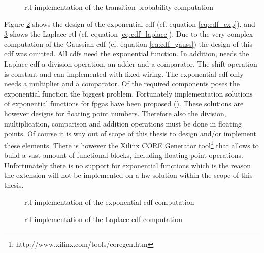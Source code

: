 \documentclass[mscthesis]{usiinfthesis}
\begin{document}
\begin{figure}
    \centering
    
    \caption{\acrshort{rtl} implementation of the transition probability
        computation}
    \label{fig:arch_ext}
\end{figure}

Figure \ref{fig:arch_cdf1} shows the design of the exponential \gls{cdf} (cf.
equation \ref{eq:cdf_exp}), and \ref{fig:arch_cdf2} shows the Laplace \gls{rtl}
(cf. equation \ref{eq:cdf_laplace}). Due to the very complex computation of the
Gaussian \gls{cdf} (cf. equation \ref{eq:cdf_gauss}) the design of this
\gls{cdf} was omitted. All \glspl{cdf} need the exponential function. In
addition, needs the Laplace \gls{cdf} a division operation, an adder and
a comparator. The shift operation is constant and can implemented with fixed
wiring. The exponential \gls{cdf} only needs a multiplier and a comparator. Of
the required components poses the exponential function the biggest problem.
Fortunately implementation solutions of exponential functions for \glspl{fpga}
have been proposed (\cite{RSSI08_Pottathuparambil, ICFPT05_Detrey}). These
solutions are however designs for floating point numbers. Therefore also the
division, multiplication, comparison and addition operations must be done in
floating points. Of course it is way out of scope of this thesis to design
and/or implement these elements.  There is however the Xilinx CORE Generator
tool\footnote{http://www.xilinx.com/tools/coregen.htm} that allows to build
a vast amount of functional blocks, including floating point operations.
Unfortunately there is no support for exponential functions which is the reason
the extension will not be implemented on a \gls{hw} solution within the scope
of this thesis.

\begin{figure}
    \centering
    
    \caption{\acrshort{rtl} implementation of the exponential \acrshort{cdf}
        computation}
    \label{fig:arch_cdf1}
\end{figure}

\begin{figure}
    \centering
    
    \caption{\acrshort{rtl} implementation of the Laplace \acrshort{cdf}
        computation}
    \label{fig:arch_cdf2}
\end{figure}

\end{document}
